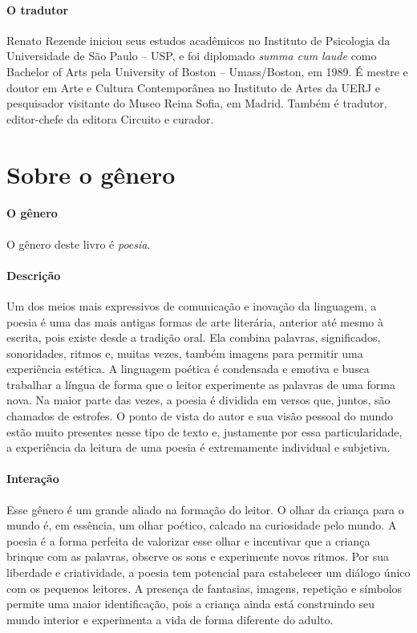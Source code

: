 \documentclass[11pt]{extarticle}
\begin{document}
\paragraph{O tradutor} Renato Rezende iniciou seus estudos acadêmicos no Instituto de Psicologia da Universidade de São Paulo – USP, e foi diplomado \textit{summa cum laude} como Bachelor of Arts pela University of Boston – Umass/Boston, em 1989. É mestre e doutor em Arte e Cultura Contemporânea no Instituto de Artes da UERJ e pesquisador visitante do Museo Reina Sofia, em Madrid. Também é tradutor, editor-chefe da editora Circuito e curador.


\section{Sobre o gênero}

\paragraph{O gênero} O gênero deste livro é \textit{poesia}. 

\paragraph{Descrição} Um dos meios mais expressivos de comunicação e inovação da linguagem, a poesia é uma das mais antigas formas de arte literária, anterior até mesmo à escrita, pois existe desde a tradição oral. Ela combina palavras, significados, sonoridades, ritmos e, muitas vezes, também imagens para permitir uma experiência estética. A linguagem poética é condensada e emotiva e busca trabalhar a língua de forma que o leitor experimente as palavras de uma forma nova. Na maior parte das vezes, a poesia é dividida em versos que, juntos, são chamados de estrofes. O ponto de vista do autor e sua visão pessoal do mundo estão muito presentes nesse tipo de texto e, justamente por essa particularidade, a experiência da leitura de uma poesia é extremamente individual e subjetiva.

\paragraph{Interação} Esse gênero é um grande aliado na formação do leitor. O olhar da criança para o mundo é, em essência, um olhar poético, calcado na curiosidade pelo mundo. A poesia é a forma perfeita de valorizar esse olhar e incentivar que a criança brinque com as palavras, observe os sons e experimente novos ritmos. Por sua liberdade e criatividade, a poesia tem potencial para estabelecer um diálogo único com os pequenos leitores. A presença de fantasias, imagens, repetição e símbolos permite uma maior identificação, pois a criança ainda está construindo seu mundo interior e experimenta a vida de forma diferente do adulto. 
\end{document}
